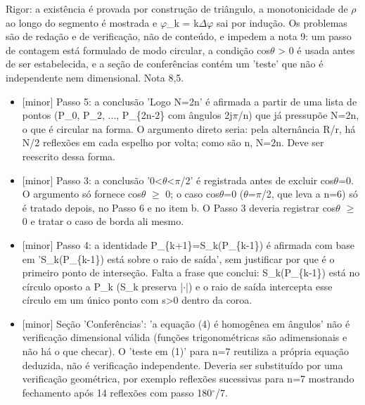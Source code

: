 \documentclass{article}%
\begin{document}
\newline%
Rigor: a existência é provada por construção de triângulo, a monotonicidade de $\rho$ ao longo do segmento é mostrada e $\varphi$\_k = k$\Delta$$\varphi$ sai por indução. Os problemas são de redação e de verificação, não de conteúdo, e impedem a nota 9: um passo de contagem está formulado de modo circular, a condição cos$\theta$ > 0 é usada antes de ser estabelecida, e a seção de conferências contém um 'teste' que não é independente nem dimensional. Nota 8,5.%
\begin{itemize}%
\item%
{[}minor{]} Passo 5: a conclusão 'Logo N=2n' é afirmada a partir de uma lista de pontos (P\_0, P\_2, ..., P\_\{2n{-}2\} com ângulos 2j$\pi$/n) que já pressupõe N=2n, o que é circular na forma. O argumento direto seria: pela alternância R/r, há N/2 reflexões em cada espelho por volta; como são n, N=2n. Deve ser reescrito dessa forma.%
\item%
{[}minor{]} Passo 3: a conclusão '0<$\theta$<$\pi$/2' é registrada antes de excluir cos$\theta$=0. O argumento só fornece cos$\theta$ $\geq$ 0; o caso cos$\theta$=0 ($\theta$=$\pi$/2, que leva a n=6) só é tratado depois, no Passo 6 e no item b. O Passo 3 deveria registrar cos$\theta$ $\geq$ 0 e tratar o caso de borda ali mesmo.%
\item%
{[}minor{]} Passo 4: a identidade P\_\{k+1\}=S\_k(P\_\{k{-}1\}) é afirmada com base em 'S\_k(P\_\{k{-}1\}) está sobre o raio de saída', sem justificar por que é o primeiro ponto de interseção. Falta a frase que conclui: S\_k(P\_\{k{-}1\}) está no círculo oposto a P\_k (S\_k preserva |$\cdot$|) e o raio de saída intercepta esse círculo em um único ponto com s>0 dentro da coroa.%
\item%
{[}minor{]} Seção 'Conferências': 'a equação (4) é homogênea em ângulos' não é verificação dimensional válida (funções trigonométricas são adimensionais e não há o que checar). O 'teste em (1)' para n=7 reutiliza a própria equação deduzida, não é verificação independente. Deveria ser substituído por uma verificação geométrica, por exemplo reflexões sucessivas para n=7 mostrando fechamento após 14 reflexões com passo 180$^\circ$/7.%
\end{itemize}%
\end{document}
